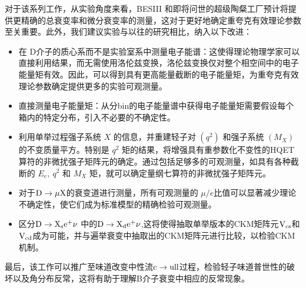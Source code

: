 对于该系列工作，从实验角度来看，BESIII 和即将问世的超级陶粲工厂预计将提供更精确的总衰变率和微分衰变率的测量，这对于更好地确定重夸克有效理论参数至关重要。此外，我们建议实验与以往的研究相比，纳入以下改进：
\begin{itemize}
\item 在 D介子的质心系而不是实验室系中测量电子能谱：这使得理论物理学家可以直接利用结果，而无需使用洛伦兹变换，洛伦兹变换仅对整个相空间中的电子能量矩有效。因此，可以得到具有更高能量截断的电子能量矩，为重夸克有效理论参数确定提供更多的实验可观测量。
\item 直接测量电子能量矩：从分bin的电子能量谱中获得电子能量矩需要假设每个箱内的特定分布，引入不必要的不确定性。
\item 利用单举过程强子系统 $X$ 的信息，并重建轻子对 $\left(q^2\right)$ 和强子系统 $\left(M_X\right)$ 的不变质量平方。特别是 $q^2$ 矩的结果，将增强具有重参数化不变性的HQET算符的非微扰强子矩阵元的确定。通过包括足够多的可观测量，如具有各种截断的 $E_e, ~ q^2$ 和 $M_X$ 矩，就可以确定量纲七算符的非微扰强子矩阵元。
\item 对于$\mathrm{D\to \mu X}$的衰变道进行测量，所有可观测量的 $\mu/e$比值可以显著减少理论不确定性，使它们成为标准模型的精确检验可观测量。
\item 区分$\mathrm{D\to X_{s} e^+\nu}$ 中的$\mathrm{D\to X_{d} e^+\nu}$,这将使得抽取单举版本的CKM矩阵元$\mathrm{V_{cs}}$和$\mathrm{V_{cd}}$成为可能，并与遍举衰变中抽取出的CKM矩阵元进行比较，以检验CKM机制。
\end{itemize}
最后，该工作可以推广至味道改变中性流$\mathrm{c\to u ll}$过程，检验轻子味道普世性的破坏以及角分布反常，这将有助于理解B介子衰变中相应的反常现象。